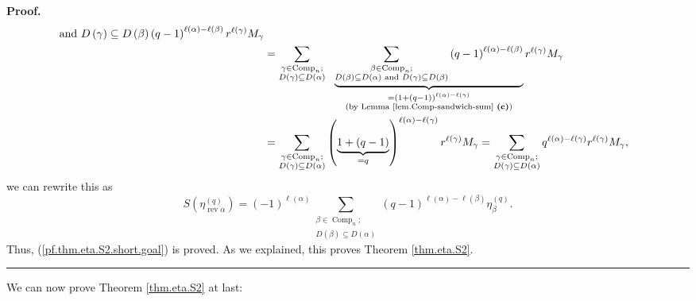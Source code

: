 \documentclass[numbers=enddot,12pt,final,onecolumn,notitlepage]{scrartcl}%
\theoremstyle{definition}
\newenvironment{proof}[1][Proof]{\noindent\textbf{#1.} }{\ \rule{0.5em}{0.5em}}
\let\sumnonlimits\sum
\renewcommand{\sum}{\sumnonlimits\limits}
\newenvironment{verlong}{}{}
\newenvironment{vershort}{}{}
\begin{document}
\begin{vershort}
\begin{proof}
\begin{align*}
{{{\text{ and }D\left(  \gamma\right)  \subseteq D\left(  \beta\right)  }%
}}\left(  q-1\right)  ^{\ell\left(  \alpha\right)  -\ell\left(  \beta\right)
}r^{\ell\left(  \gamma\right)  }M_{\gamma}\\
&  =\sum_{\substack{\gamma\in\operatorname*{Comp}\nolimits_{n};\\D\left(
\gamma\right)  \subseteq D\left(  \alpha\right)  }}\ \ \underbrace{\sum
_{\substack{\beta\in\operatorname*{Comp}\nolimits_{n};\\D\left(  \beta\right)
\subseteq D\left(  \alpha\right)  \text{ and }D\left(  \gamma\right)
\subseteq D\left(  \beta\right)  }}\left(  q-1\right)  ^{\ell\left(
\alpha\right)  -\ell\left(  \beta\right)  }}_{\substack{=\left(  1+\left(
q-1\right)  \right)  ^{\ell\left(  \alpha\right)  -\ell\left(  \gamma\right)
}\\\text{(by Lemma \ref{lem.Comp-sandwich-sum} \textbf{(c)})}}}r^{\ell\left(
\gamma\right)  }M_{\gamma}\\
&  =\sum_{\substack{\gamma\in\operatorname*{Comp}\nolimits_{n};\\D\left(
\gamma\right)  \subseteq D\left(  \alpha\right)  }}\left(
\underbrace{1+\left(  q-1\right)  }_{=q}\right)  ^{\ell\left(  \alpha\right)
-\ell\left(  \gamma\right)  }r^{\ell\left(  \gamma\right)  }M_{\gamma}%
=\sum_{\substack{\gamma\in\operatorname*{Comp}\nolimits_{n};\\D\left(
\gamma\right)  \subseteq D\left(  \alpha\right)  }}q^{\ell\left(
\alpha\right)  -\ell\left(  \gamma\right)  }r^{\ell\left(  \gamma\right)
}M_{\gamma},
\end{align*}
we can rewrite this as%
\[
S\left(  \eta_{\operatorname*{rev}\alpha}^{\left(  q\right)  }\right)
=\left(  -1\right)  ^{\ell\left(  \alpha\right)  }\sum_{\substack{\beta
\in\operatorname*{Comp}\nolimits_{n};\\D\left(  \beta\right)  \subseteq
D\left(  \alpha\right)  }}\left(  q-1\right)  ^{\ell\left(  \alpha\right)
-\ell\left(  \beta\right)  }\eta_{\beta}^{\left(  q\right)  }.
\]
Thus, (\ref{pf.thm.eta.S2.short.goal}) is proved. As we explained, this proves
Theorem \ref{thm.eta.S2}.
\end{proof}
\end{vershort}

\begin{verlong}
We can now prove Theorem \ref{thm.eta.S2} at last:
\end{verlong}
\end{document}

